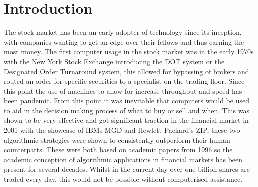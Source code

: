 \documentclass[12pt,a4paper]{article}
\begin{document}
\section{Introduction}

\iffalse
This section briefly introduces the general project background, the research question you are addressing, and the project objectives.  It should be between 2 to 3 pages in length.  Do not change the font sizes or line spacing in order to put in more text.

- Same as the aims just longer.\\
- What is the aim for a year?\\
- Objectives.\\
- What is the state of the art in the field?\\
- A bit of the history of trading.\\
\fi

The stock market has been an early adopter of technology since its inception, with companies wanting to get an edge over their fellows and thus earning the most money. The first computer usage in the stock market was in the early 1970s with the New York Stock Exchange introducing the DOT system or the Designated Order Turnaround system, this allowed for bypassing of brokers and routed an order for specific securities to a specialist on the trading floor. Since this point the use of machines to allow for increase throughput and speed has been pandemic. From this point it was inevitable that computers would be used to aid in the decision making process of what to buy or sell and when. This was shown to be very effective and got significant traction in the financial market in 2001 with the showcase of IBMs MGD and  Hewlett-Packard's ZIP, these two algorithmic strategies were shown to consistently outperform their human counterparts. These were both based on academic papers from 1996 so the academic conception of algorithmic applications in financial markets has been present for several decades. Whilst in the current day over one billion shares are traded every day, this would not be possible without computerised assistance. \\
\end{document}
